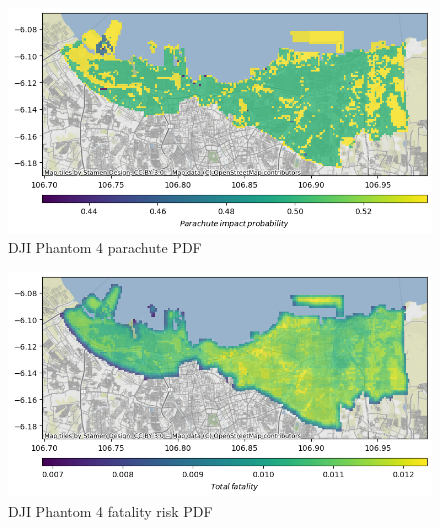 \documentclass[12pt]{report}
\begin{document}
        \begin{figure}[H]
            \centering
            \includegraphics[width=\textwidth]{Plot/phantom4/parachute_pdf.png}
            \caption{DJI Phantom 4 parachute PDF}
        \end{figure}
        \begin{figure}[H]
            \centering
            \includegraphics[width=\textwidth]{Plot/phantom4/total_fatality_pdf.png}
            \caption{DJI Phantom 4 fatality risk PDF}
        \end{figure}
\end{document}
